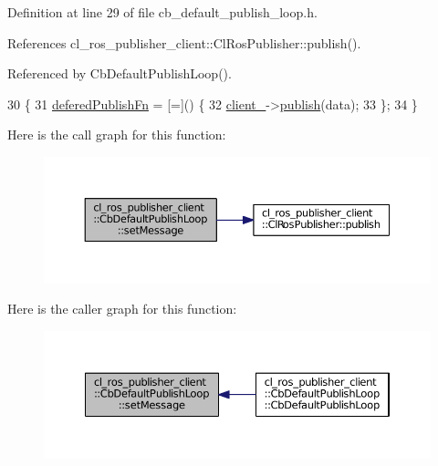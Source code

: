 Definition at line 29 of file cb\+\_\+default\+\_\+publish\+\_\+loop.\+h.



References cl\+\_\+ros\+\_\+publisher\+\_\+client\+::\+Cl\+Ros\+Publisher\+::publish().



Referenced by Cb\+Default\+Publish\+Loop().


\begin{DoxyCode}
30     \{
31         \hyperlink{classcl__ros__publisher__client_1_1CbDefaultPublishLoop_adbba1961e7aebdd5d594b54cf5ffd663}{deferedPublishFn} = [=]() \{
32             \hyperlink{classcl__ros__publisher__client_1_1CbDefaultPublishLoop_ada1d3d64ab6bf67473266560c07596b9}{client\_}->\hyperlink{classcl__ros__publisher__client_1_1ClRosPublisher_ad97b6c1e29e56a2e4a5a6554a93be67c}{publish}(data);
33         \};
34     \}
\end{DoxyCode}


Here is the call graph for this function\+:
\nopagebreak
\begin{figure}[H]
\begin{center}
\leavevmode
\includegraphics[width=350pt]{classcl__ros__publisher__client_1_1CbDefaultPublishLoop_ac1199252771fdf4cb62c071cff38a03b_cgraph}
\end{center}
\end{figure}




Here is the caller graph for this function\+:
\nopagebreak
\begin{figure}[H]
\begin{center}
\leavevmode
\includegraphics[width=350pt]{classcl__ros__publisher__client_1_1CbDefaultPublishLoop_ac1199252771fdf4cb62c071cff38a03b_icgraph}
\end{center}
\end{figure}


